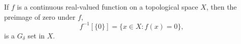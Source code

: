 If $f$ is a continuous real-valued function on a topological space $X$, then the preimage of zero under $f$,
$$f^{-1}[\{0\}] = \{x \in X : f(x) = 0\},$$
is a $G_\delta$ set in $X$.
